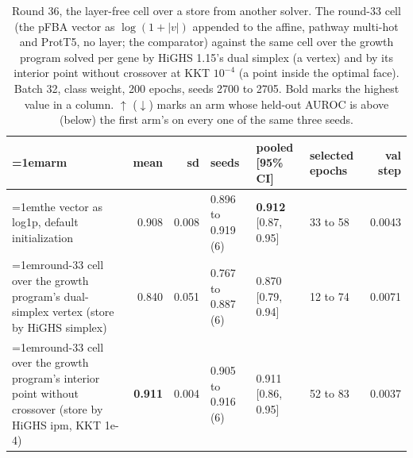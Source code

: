 \begin{table}[H]
  \centering
  \scriptsize
  \setlength{\tabcolsep}{2.5pt}
  \caption[Round 36, the layer-free cell over a store from another solver]{Round 36, the layer-free cell over a store from another solver. The round-33 cell (the pFBA vector as $\log(1 + |v|)$ appended to the affine, pathway multi-hot and ProtT5, no layer; the comparator) against the same cell over the growth program solved per gene by HiGHS 1.15's dual simplex (a vertex) and by its interior point without crossover at KKT $10^{-4}$ (a point inside the optimal face). Batch 32, class weight, 200 epochs, seeds 2700 to 2705. Bold marks the highest value in a column. $\uparrow$ ($\downarrow$) marks an arm whose held-out AUROC is above (below) the first arm's on every one of the same three seeds.}
  \label{tab:w52}
  \begin{tabular}{@{}>{\raggedright\hangindent=1em\hangafter=1\arraybackslash}p{84.4mm}rrlllr@{}}
    \hline
    arm & mean & sd & seeds & pooled [95\% CI] & selected epochs & val step \\
    \hline
    the vector as log1p, default initialization & 0.908 & 0.008 & 0.896 to 0.919 (6) & \textbf{0.912} [0.87, 0.95] & 33 to 58 & 0.0043 \\
    round-33 cell over the growth program's dual-simplex vertex (store by HiGHS simplex) & 0.840 & 0.051 & 0.767 to 0.887 (6) & 0.870 [0.79, 0.94] & 12 to 74 & 0.0071 \\
    round-33 cell over the growth program's interior point without crossover (store by HiGHS ipm, KKT 1e-4) & \textbf{0.911} & 0.004 & 0.905 to 0.916 (6) & 0.911 [0.86, 0.95] & 52 to 83 & 0.0037 \\
    \hline
  \end{tabular}
\end{table}
